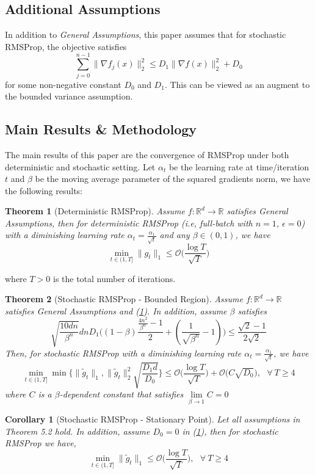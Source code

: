 \documentclass{article}
\newtheorem{theorem}{Theorem}[section]
\newtheorem{corollary}{Corollary}[section]
\begin{document}
\subsection{Additional Assumptions}
In addition to \textit{General Assumptions}, this paper assumes that for stochastic RMSProp, the objective satisfies
\begin{equation}
\label{eq51}
\sum_{j = 0}^{n - 1} \|\nabla f_j(x)\|_2^2 \leq D_1 \|\nabla f(x)\|_2^2 + D_0
\end{equation}
for some non-negative constant $D_0$ and $D_1$. This can be viewed as an augment to the bounded variance assumption.
\subsection{Main Results \& Methodology}
The main results of this paper are the convergence of RMSProp under both deterministic and stochastic setting. Let $\alpha_t$  be the learning rate at time/iteration $t$ and $\beta$ be the moving average parameter of the squared gradients norm, we have the following results: 
\begin{theorem}[Deterministic RMSProp]
	\label{theom51}
Assume $f:\mathbb{R}^d \rightarrow \mathbb{R}$ satisfies General Assumptions, then for deterministic RMSProp (i.e, full-batch with $n = 1$, $\epsilon = 0$) with a diminishing learning rate $\alpha_t = \frac{\alpha_1}{\sqrt{t}}$ and any $\beta \in (0, 1)$, we have
\[
\min_{t \in (1, T]} \|g_t\|_1 \leq \mathcal{O}\Big(\frac{\log T}{\sqrt{T}}\Big)
\]
\end{theorem}
where $T > 0$ is the total number of iterations.
\begin{theorem}[Stochastic RMSProp - Bounded Region]
	\label{theom52}
	Assume $f:\mathbb{R}^d \rightarrow \mathbb{R}$ satisfies General Assumptions and (\hyperref[eq51]{1}). In addition, assume $\beta$ satisfies
	\[
	\sqrt{\frac{10dn}{\beta^n}}dnD_1\Big((1 - \beta)\frac{\frac{4n^2}{\beta^n} - 1}{2} + (\frac{1}{\sqrt{\beta^n}}- 1)\Big)\leq \frac{\sqrt{2} - 1}{2\sqrt{2}}
	\]
	Then, for stochastic RMSProp with a diminishing learning rate $\alpha_t = \frac{\alpha_1}{\sqrt{t}}$, we have
	\[
	\min_{t \in (1, T]} \min\{\|\tilde{g}_t\|_1, \|\tilde{g}_t\|_2^2\sqrt{\frac{D_1d}{D_0}}\} \leq \mathcal{O}\Big(\frac{\log T}{\sqrt{T}}\Big) + \mathcal{O}\Big(C\sqrt{D_0}\Big), \ \ \ \forall \ T\geq 4
	\]
	where $C$ is a $\beta$-dependent constant that satisfies $\lim\limits_{\beta \rightarrow 1} C = 0$
\end{theorem}
\begin{corollary}[Stochastic RMSProp - Stationary Point]
	\label{coro51}
	Let all assumptions in Theorem 5.2 hold. In addition, assume $D_0 = 0$ in (\hyperref[eq51]{1}), then for stochastic RMSProp we have,
\[
\min_{t \in (1, T]} \|\tilde{g}_t\|_1 \leq \mathcal{O}\Big(\frac{\log T}{\sqrt{T}}\Big), \ \ \ \forall \ T \geq 4
\]
\end{corollary}
\end{document}
